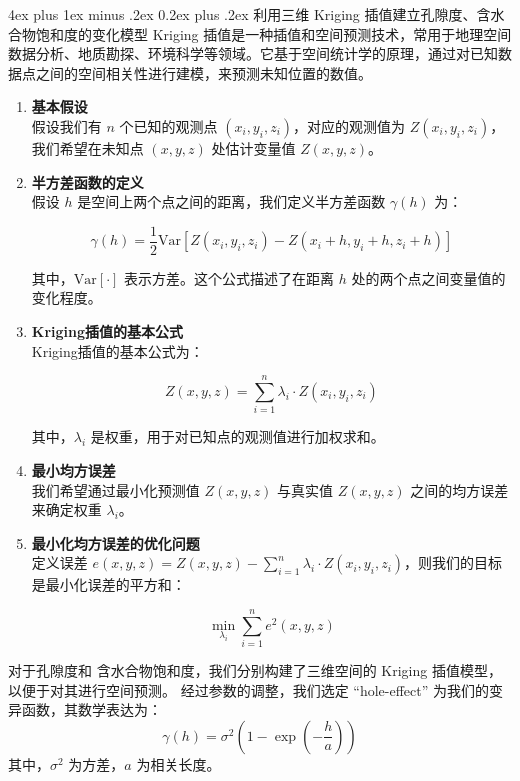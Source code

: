 \documentclass[12pt,a4paper]{nmmcm}
\makeatletter
\renewcommand\subsubsection{\@startsection{subsubsection}{3}{1em}%
  {4ex plus 1ex minus .2ex}%
  {0.2ex plus .2ex}%
  {\normalfont\large\bfseries}}
\makeatother
\begin{document}
\subsubsection{利用三维 Kriging 插值建立孔隙度、含水合物饱和度的变化模型}
Kriging 插值是一种插值和空间预测技术，常用于地理空间数据分析、地质勘探、环境科学等领域。它基于空间统计学的原理，通过对已知数据点之间的空间相关性进行建模，来预测未知位置的数值。
\begin{enumerate}
  \item \textbf{基本假设} \\
        假设我们有 $n$ 个已知的观测点 $(x_i, y_i, z_i)$，对应的观测值为 $Z(x_i, y_i, z_i)$，我们希望在未知点 $(x, y, z)$ 处估计变量值 $Z(x, y, z)$。

  \item \textbf{半方差函数的定义} \\
        假设 $h$ 是空间上两个点之间的距离，我们定义半方差函数 $\gamma(h)$ 为：

        \[
          \gamma(h) = \frac{1}{2} \text{Var}[Z(x_i, y_i, z_i) - Z(x_i+h, y_i+h, z_i+h)]
        \]

        其中，$\text{Var}[\cdot]$ 表示方差。这个公式描述了在距离 $h$ 处的两个点之间变量值的变化程度。
  \item \textbf{Kriging插值的基本公式} \\
        Kriging插值的基本公式为：

        \[
          Z(x, y, z) = \sum_{i=1}^{n} \lambda_i \cdot Z(x_i, y_i, z_i)
        \]

        其中，$\lambda_i$ 是权重，用于对已知点的观测值进行加权求和。
  \item \textbf{最小均方误差} \\
        我们希望通过最小化预测值 $Z(x, y, z)$ 与真实值 $Z(x, y, z)$ 之间的均方误差来确定权重 $\lambda_i$。
  \item \textbf{最小化均方误差的优化问题} \\
        定义误差 $e(x, y, z) = Z(x, y, z) - \sum_{i=1}^{n} \lambda_i \cdot Z(x_i, y_i, z_i)$，则我们的目标是最小化误差的平方和：

        \[
          \min_{\lambda_i} \sum_{i=1}^{n} e^2(x, y, z)
        \]
\end{enumerate}
对于孔隙度和 含水合物饱和度，我们分别构建了三维空间的 Kriging 插值模型，以便于对其进行空间预测。
经过参数的调整，我们选定 “hole-effect” 为我们的变异函数，其数学表达为：
\[
  \gamma(h) = \sigma^2 \left(1 - \exp\left(-\frac{h}{a}\right)\right)
\]
其中，$\sigma^2$ 为方差，$a$ 为相关长度。
\end{document}
